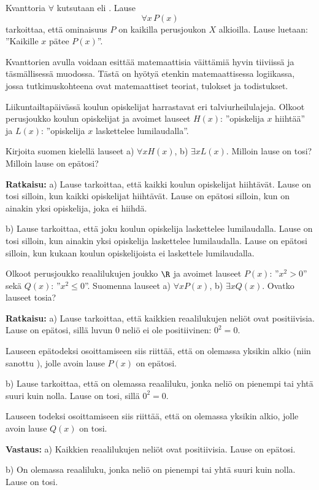 Kvanttoria $\forall$ kutsutaan  eli . Lause
\[
\forall x\, P(x)
\]
tarkoittaa, että ominaisuus $P$ on kaikilla perusjoukon $X$ alkioilla. Lause luetaan: ''Kaikille $x$ pätee $P(x)$''.

Kvanttorien avulla voidaan esittää matemaattisia väittämiä hyvin tiiviissä ja täsmällisessä muodossa. Tästä on hyötyä etenkin matemaattisessa logiikassa, jossa tutkimuskohteena ovat matemaattiset teoriat, tulokset ja todistukset. 

\begin{esimerkki}
Liikuntailtapäivässä koulun opiskelijat harrastavat eri talviurheilulajeja. Olkoot perusjoukko koulun opiskelijat ja avoimet lauseet $H(x)$: ''opiskelija $x$
 hiihtää'' ja $L(x)$: ''opiskelija $x$ laskettelee lumilaudalla''.

Kirjoita suomen kielellä lauseet a) $\forall x H(x)$,  b)  $\exists x L(x)$. Milloin lause on tosi? Milloin lause on epätosi?

{\bf Ratkaisu:} a) Lause tarkoittaa, että kaikki koulun opiskelijat hiihtävät. Lause on tosi silloin, kun
kaikki opiskelijat hiihtävät. Lause on epätosi silloin, kun on ainakin yksi opiskelija, joka ei 
hiihdä.  

b) Lause tarkoittaa, että joku koulun opiskelija laskettelee lumilaudalla. Lause on tosi
silloin, kun ainakin yksi opiskelija laskettelee lumilaudalla. Lause on epätosi silloin, kun 
kukaan koulun opiskelijoista ei laskettele lumilaudalla. 
\end{esimerkki}

\begin{esimerkki}
Olkoot perusjoukko reaalilukujen joukko $\R$ ja avoimet lauseet  $P(x)$: ''$x^2 > 0$''  sekä  
$Q(x)$: ''$x^2\le  0$''. Suomenna lauseet  a) $\forall x P(x)$,   b) $\exists x Q(x)$. Ovatko lauseet tosia?

{\bf Ratkaisu:}	a) Lause tarkoittaa, että kaikkien reaalilukujen neliöt ovat positiivisia. Lause on epätosi, sillä luvun $0$ neliö ei ole positiivinen: $0^2=0$.

Lauseen epätodeksi osoittamiseen siis riittää, että on olemassa yksikin alkio (niin sanottu ), jolle avoin lause $P(x)$ on epätosi.

b)  Lause tarkoittaa, että on olemassa reaaliluku, jonka neliö on pienempi tai 
yhtä suuri kuin nolla. Lause on tosi, sillä $0^2 = 0$.

Lauseen todeksi osoittamiseen siis riittää, että on olemassa yksikin alkio, jolle avoin lause $Q(x)$ on tosi.

{\bf Vastaus:}	
a) Kaikkien reaalilukujen neliöt ovat positiivisia. Lause on epätosi.

b) On olemassa reaaliluku, jonka neliö on pienempi tai yhtä suuri kuin nolla. Lause on tosi. 
\end{esimerkki}

